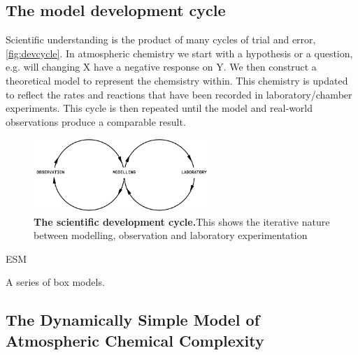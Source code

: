 \subsection{The model development cycle}
Scientific understanding is the product of many cycles of trial and error, \autoref{fig:devcycle}. In atmospheric chemistry we start with a hypothesis or a question, e.g. will changing X have a negative response on Y. We then construct a theoretical model to represent the chemsistry within. This chemistry is updated to reflect the rates and reactions that have been recorded in laboratory/chamber experiments. This cycle is then repeated until the model and real-world observations produce a comparable result.

\begin{figure}[H]
    \centering
    \includegraphics[width=0.6\textwidth]{devcycle.png}
    \caption{\textbf{The scientific development cycle.}This shows the iterative nature between modelling, observation and laboratory experimentation}
    \label{fig:devcycle}
\end{figure}






ESM

 A series of box models.


 \subsection{The Dynamically Simple Model of Atmospheric Chemical Complexity}








